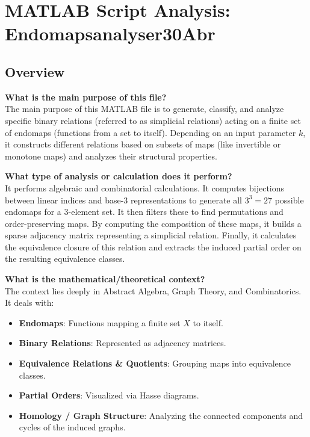 \chapter{MATLAB Script Analysis: Endomapsanalyser30Abr}

\section{Overview}

\textbf{What is the main purpose of this file?} \\
The main purpose of this MATLAB file is to generate, classify, and analyze specific binary relations (referred to as simplicial relations) acting on a finite set of endomaps (functions from a set to itself). Depending on an input parameter $k$, it constructs different relations based on subsets of maps (like invertible or monotone maps) and analyzes their structural properties.

\textbf{What type of analysis or calculation does it perform?} \\
It performs algebraic and combinatorial calculations. It computes bijections between linear indices and base-3 representations to generate all $3^3 = 27$ possible endomaps for a 3-element set. It then filters these to find permutations and order-preserving maps. By computing the composition of these maps, it builds a sparse adjacency matrix representing a simplicial relation. Finally, it calculates the equivalence closure of this relation and extracts the induced partial order on the resulting equivalence classes.

\textbf{What is the mathematical/theoretical context?} \\
The context lies deeply in Abstract Algebra, Graph Theory, and Combinatorics. It deals with:
\begin{itemize}
    \item \textbf{Endomaps}: Functions mapping a finite set $X$ to itself.
    \item \textbf{Binary Relations}: Represented as adjacency matrices.
    \item \textbf{Equivalence Relations \& Quotients}: Grouping maps into equivalence classes.
    \item \textbf{Partial Orders}: Visualized via Hasse diagrams.
    \item \textbf{Homology / Graph Structure}: Analyzing the connected components and cycles of the induced graphs.
\end{itemize}

